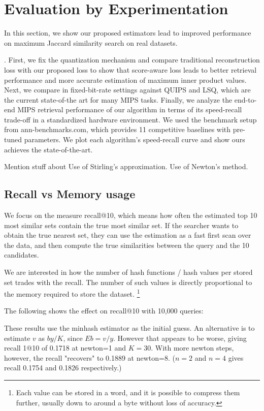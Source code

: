 
\section{Evaluation by Experimentation}\label{sec:evaluation}

In this section, we show our proposed estimators lead to improved performance on maximum
Jaccard similarity search on real datasets.

. First, we fix the quantization
mechanism and compare traditional reconstruction
loss with our proposed loss to show that score-aware
loss leads to better retrieval performance and more accurate estimation of maximum inner product values.
Next, we compare in fixed-bit-rate settings against
QUIPS and LSQ, which are the current state-of-the art for many MIPS tasks. Finally, we analyze the
end-to-end MIPS retrieval performance of our algorithm in terms of its speed-recall trade-off in a
standardized hardware environment. We used the
benchmark setup from ann-benchmarks.com, which
provides 11 competitive baselines with pre-tuned parameters. We plot each algorithm’s speed-recall curve
and show ours achieves the state-of-the-art.

Mention stuff about
Use of Stirling's approximation.
Use of Newton's method.

\subsection{Recall vs Memory usage}

We focus on the measure recall@10, which means how often the estimated top 10 most similar sets contain the true most similar set.
If the searcher wants to obtain the true nearest set, they can use the estimation as a fast first scan over the data, and then compute the true similarities between the query and the 10 candidates.

We are interested in how the number of hash functions / hash values per stored set trades with the recall.
The number of such values is directly proportional to the memory required to store the dataset.
\footnote{Each value can be stored in a word, and it is possible to compress them further, usually down to around a byte without loss of accuracy.}

The following shows the effect on recall@10 with 10,000 queries:

These results use the minhash estimator as the initial guess.
An alternative is to estimate $v$ as $by/K$, since $Eb=v/y$.
However that appears to be worse, giving recall 1@10 of 0.1718 at newton=1 and $K=30$.
With more newton steps, however, the recall "recovers" to 0.1889 at newton=8.
($n=2$ and $n=4$ gives recall 0.1754 and 0.1826 respectively.)

